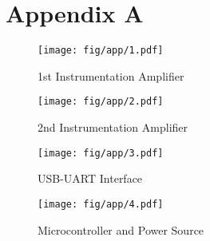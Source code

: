 
\chapter*{Appendix A}
\label{AppendixA} %


\begin{figure}[h]

	\begin{center}
	\texttt{[image: fig/app/1.pdf]}
	\end{center}
	\vspace{-4mm}
	\caption[1st Instrumentation Amplifier]
	{1st Instrumentation Amplifier}
	\label{fig:app1}
	\vspace{-2mm}
\end{figure}

\begin{figure}[h]
	\begin{center}
	\texttt{[image: fig/app/2.pdf]}
	\end{center}
	\vspace{-4mm}
	\caption[2nd Instrumentation Amplifier]
	{2nd Instrumentation Amplifier}
	\label{fig:app2}
	\vspace{-2mm}
\end{figure}

\begin{figure}[h]
	\begin{center}
	\texttt{[image: fig/app/3.pdf]}
	\end{center}
	\vspace{-4mm}
	\caption[USB-UART Interface]
	{USB-UART Interface}
	\label{fig:app3}
	\vspace{-2mm}
\end{figure}

\begin{figure}[h]
	\begin{center}
	\texttt{[image: fig/app/4.pdf]}
	\end{center}
	\vspace{-4mm}
	\caption[Microcontroller and Power Source]
	{Microcontroller and Power Source}
	\label{fig:app4}
	\vspace{-2mm}
\end{figure}

